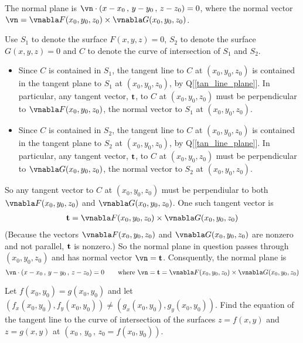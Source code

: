 \begin{answer}
The normal plane is $\vn\cdot\left( x-x_0\,,\,y-y_0\,,\,z-z_0\right) =0$,
where the normal vector 
$\vn = \vnabla F(x_0,y_0,z_0)\times \vnabla G(x_0,y_0,z_0)$.
\end{answer}

\begin{solution}
Use $S_1$ to denote the surface $F(x,y,z)=0$, 
    $S_2$ to denote the surface $G(x,y,z)=0$ and 
    $C$ to denote the curve of intersection of $S_1$ and $S_2$.
\begin{itemize}
\item
Since $C$ is contained in $S_1$, the tangent line to $C$ at $(x_0,y_0,z_0)$
is contained in the tangent plane to $S_1$ at $(x_0,y_0,z_0)$, by 
Q[\ref{tan_line_plane}]. In particular, any tangent vector, $\mathbf{t}$, to 
$C$ at $(x_0,y_0,z_0)$ must be perpendicular to $\vnabla F(x_0,y_0,z_0)$,
the normal vector to $S_1$ at $(x_0,y_0,z_0)$.

\item
Since $C$ is contained in $S_2$, the tangent line to $C$ at $(x_0,y_0,z_0)$
is contained in the tangent plane to $S_2$ at $(x_0,y_0,z_0)$, by 
Q[\ref{tan_line_plane}]. In particular, any tangent vector, $\mathbf{t}$, to 
$C$ at $(x_0,y_0,z_0)$ must be perpendicular to $\vnabla G(x_0,y_0,z_0)$,
the normal vector to $S_2$ at $(x_0,y_0,z_0)$.
\end{itemize}
So any tangent vector to $C$ at $(x_0,y_0,z_0)$ must be perpendiular to both
$\vnabla F(x_0,y_0,z_0)$ and $\vnabla G(x_0,y_0,z_0)$.
One such tangent vector is
\begin{align*}
\vt = \vnabla F(x_0,y_0,z_0)\times \vnabla G(x_0,y_0,z_0)
\end{align*}
(Because the vectors $\vnabla F(x_0,y_0,z_0)$ and $\vnabla G(x_0,y_0,z_0)$
are nonzero and not parallel, $\mathbf{t}$ is nonzero.) So the normal plane in 
question passes through $(x_0,y_0,z_0)$ and has normal vector $\vn=\vt$.
Consquently, the normal plane is
\begin{equation*}
\vn\cdot\left( x-x_0\,,\,y-y_0\,,\,z-z_0\right) =0 \qquad\text{where }
\vn=\vt=\vnabla F(x_0,y_0,z_0)\times \vnabla G(x_0,y_0,z_0)
\end{equation*}


\end{solution}

\begin{question}
Let $f(x_0,y_0)=g(x_0,y_0)$ and let 
$\left( f_x(x_0,y_0), f_y(x_0,y_0)\right)\ne \left( g_x(x_0,y_0), g_y(x_0,y_0)\right)$. Find the equation of the tangent line to the 
curve of intersection of the surfaces $z=f(x,y)$ and $z=g(x,y)$ at
$(x_0\,,\,y_0\,,\,z_0=f(x_0,y_0))$.
\end{question}

